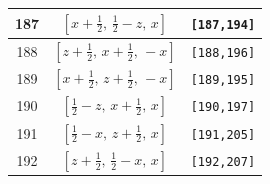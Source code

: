 \documentclass[fleqn,8pt]{jsarticle}
\begin{document}
\begin{longtable}{ccc}
187 & $\left[ x + \frac{1}{2},\, \frac{1}{2} - z,\, x \right]$ & {\tt [187,194]} \\ \hline
188 & $\left[ z + \frac{1}{2},\, x + \frac{1}{2},\, - x \right]$ & {\tt [188,196]} \\ \hline
189 & $\left[ x + \frac{1}{2},\, z + \frac{1}{2},\, - x \right]$ & {\tt [189,195]} \\ \hline
190 & $\left[ \frac{1}{2} - z,\, x + \frac{1}{2},\, x \right]$ & {\tt [190,197]} \\ \hline
191 & $\left[ \frac{1}{2} - x,\, z + \frac{1}{2},\, x \right]$ & {\tt [191,205]} \\ \hline
192 & $\left[ z + \frac{1}{2},\, \frac{1}{2} - x,\, x \right]$ & {\tt [192,207]} \\
\end{longtable}
\renewcommand{\arraystretch}{1.2}
\end{document}
